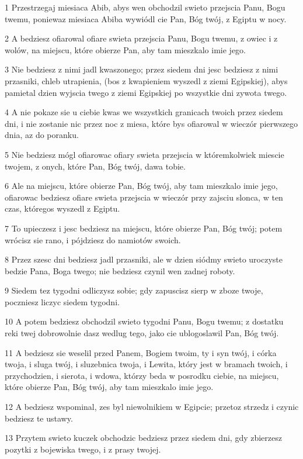 \par 1 Przestrzegaj miesiaca Abib, abys wen obchodzil swieto przejscia Panu, Bogu twemu, poniewaz miesiaca Abiba wywiódl cie Pan, Bóg twój, z Egiptu w nocy.
\par 2 A bedziesz ofiarowal ofiare swieta przejscia Panu, Bogu twemu, z owiec i z wolów, na miejscu, które obierze Pan, aby tam mieszkalo imie jego.
\par 3 Nie bedziesz z nimi jadl kwaszonego; przez siedem dni jesc bedziesz z nimi przasniki, chleb utrapienia, (bos z kwapieniem wyszedl z ziemi Egipskiej), abys pamietal dzien wyjscia twego z ziemi Egipskiej po wszystkie dni zywota twego.
\par 4 A nie pokaze sie u ciebie kwas we wszystkich granicach twoich przez siedem dni, i nie zostanie nic przez noc z miesa, które bys ofiarowal w wieczór pierwszego dnia, az do poranku.
\par 5 Nie bedziesz mógl ofiarowac ofiary swieta przejscia w któremkolwiek miescie twojem, z onych, które Pan, Bóg twój, dawa tobie.
\par 6 Ale na miejscu, które obierze Pan, Bóg twój, aby tam mieszkalo imie jego, ofiarowac bedziesz ofiare swieta przejscia w wieczór przy zajsciu slonca, w ten czas, któregos wyszedl z Egiptu.
\par 7 To upieczesz i jesc bedziesz na miejscu, które obierze Pan, Bóg twój; potem wrócisz sie rano, i pójdziesz do namiotów swoich.
\par 8 Przez szesc dni bedziesz jadl przasniki, ale w dzien siódmy swieto uroczyste bedzie Pana, Boga twego; nie bedziesz czynil wen zadnej roboty.
\par 9 Siedem tez tygodni odliczysz sobie; gdy zapuscisz sierp w zboze twoje, poczniesz liczyc siedem tygodni.
\par 10 A potem bedziesz obchodzil swieto tygodni Panu, Bogu twemu; z dostatku reki twej dobrowolnie dasz wedlug tego, jako cie ublogoslawil Pan, Bóg twój.
\par 11 A bedziesz sie weselil przed Panem, Bogiem twoim, ty i syn twój, i córka twoja, i sluga twój, i sluzebnica twoja, i Lewita, który jest w bramach twoich, i przychodzien, i sierota, i wdowa, którzy beda w posrodku ciebie, na miejscu, które obierze Pan, Bóg twój, aby tam mieszkalo imie jego.
\par 12 A bedziesz wspominal, zes byl niewolnikiem w Egipcie; przetoz strzedz i czynic bedziesz te ustawy.
\par 13 Przytem swieto kuczek obchodzic bedziesz przez siedem dni, gdy zbierzesz pozytki z bojewiska twego, i z prasy twojej.
